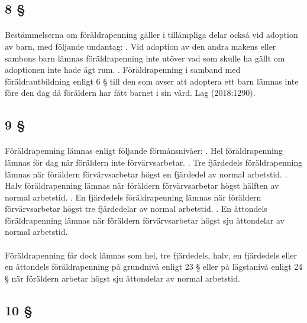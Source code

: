\documentclass[a4paper,notitlepage,openany,10pt]{book}
\begin{document}
\subsection*{8 §}
\paragraph*{}
Bestämmelserna om föräldrapenning gäller i tillämpliga delar också vid adoption av barn, med följande undantag:
. Vid adoption av den andra makens eller sambons barn lämnas föräldrapenning inte utöver vad som skulle ha gällt om adoptionen inte hade ägt rum.
. Föräldrapenning i samband med föräldrautbildning enligt 6 § till den som avser att adoptera ett barn lämnas inte före den dag då föräldern har fått barnet i sin vård.
Lag (2018:1290).
\subsection*{9 §}
\paragraph*{}
Föräldrapenning lämnas enligt följande förmånsnivåer:
. Hel föräldrapenning lämnas för dag när föräldern inte förvärvsarbetar.
. Tre fjärdedels föräldrapenning lämnas när föräldern förvärvsarbetar högst en fjärdedel av normal arbetstid.
. Halv föräldrapenning lämnas när föräldern förvärvsarbetar högst hälften av normal arbetstid.
. En fjärdedels föräldrapenning lämnas när föräldern förvärvsarbetar högst tre fjärdedelar av normal arbetstid.
. En åttondels föräldrapenning lämnas när föräldern förvärvsarbetar högst sju åttondelar av normal arbetstid.
\paragraph*{}
Föräldrapenning får dock lämnas som hel, tre fjärdedels, halv, en fjärdedels eller en åttondels föräldrapenning på grundnivå enligt 23 § eller på lägstanivå enligt 24 § när föräldern arbetar högst sju åttondelar av normal arbetstid.
\subsection*{10 §}
\end{document}
